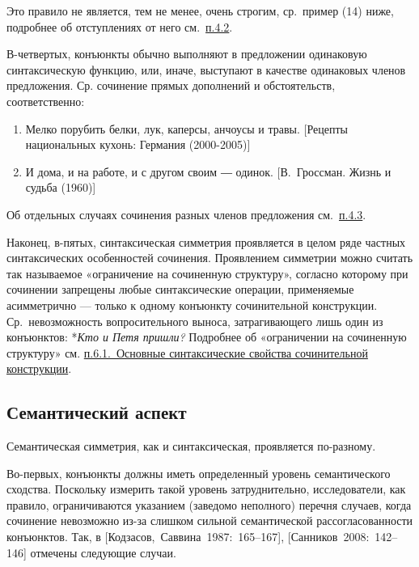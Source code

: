 Это правило не является, тем не менее, очень строгим, ср.~пример (14)
ниже, подробнее об отступлениях от него см.~\underline{п.4.2}.

В-четвертых, конъюнкты обычно выполняют в предложении одинаковую
синтаксическую функцию, или, иначе, выступают в качестве одинаковых
членов предложения. Ср. сочинение прямых дополнений и обстоятельств,
соответственно:

\begin{enumerate}
  \def\labelenumi{(\arabic{enumi})}
  \setcounter{enumi}{12}
  \item
        Мелко порубить белки, лук, каперсы, анчоусы и травы. {[}Рецепты
        национальных кухонь: Германия (2000-2005){]}
  \item
        И дома, и на работе, и с другом своим ― одинок. {[}В.~Гроссман. Жизнь
        и судьба (1960){]}
\end{enumerate}

Об отдельных случаях сочинения разных членов предложения
см.~\underline{п.4.3}.

Наконец, в-пятых, синтаксическая симметрия проявляется в целом ряде
частных синтаксических особенностей сочинения. Проявлением симметрии
можно считать так называемое «ограничение на сочиненную структуру»,
согласно которому при сочинении запрещены любые синтаксические операции,
применяемые асимметрично --- только к одному конъюнкту сочинительной
конструкции. Ср.~невозможность вопросительного выноса, затрагивающего
лишь один из конъюнктов: *\textit{Кто и Петя пришли?} Подробнее об
«ограничении на сочиненную структуру» см. \underline{п.6.1.~Основные
  синтаксические свойства сочинительной конструкции}.

\subsection{Семантический
  аспект}\label{ux441ux435ux43cux430ux43dux442ux438ux447ux435ux441ux43aux438ux439-ux430ux441ux43fux435ux43aux442}

Семантическая симметрия, как и синтаксическая, проявляется по-разному.

Во-первых, конъюнкты должны иметь определенный уровень семантического
сходства. Поскольку измерить такой уровень затруднительно,
исследователи, как правило, ограничиваются указанием (заведомо
неполного) перечня случаев, когда сочинение невозможно из-за слишком
сильной семантической рассогласованности конъюнктов. Так, в
{[}Кодзасов,~Саввина~1987:~165--167{]}, {[}Санников~2008:~142--146{]}
отмечены следующие случаи.

